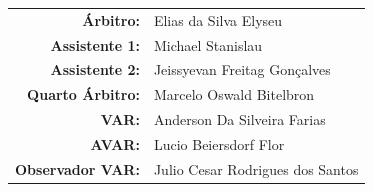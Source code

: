 \documentclass[11pt]{article}
\newcommand{\teamjersey}{}
\begin{document}
\vspace{0.5cm}
\begin{minipage}{0.65\textwidth}
\begin{center}
\begin{tabular}{rl}
\textbf{Árbitro:} & Elias da Silva Elyseu \\
\textbf{Assistente 1:} & Michael Stanislau \\
\textbf{Assistente 2:} & Jeissyevan Freitag Gonçalves \\
\textbf{Quarto Árbitro:} & Marcelo Oswald Bitelbron \\
\textbf{VAR:} & Anderson Da Silveira Farias \\
\textbf{AVAR:} & Lucio Beiersdorf Flor \\
\textbf{Observador VAR:} & Julio Cesar Rodrigues dos Santos \\
\end{tabular}
\end{center}
\end{minipage}
\begin{minipage}{0.3\textwidth}
\end{minipage}
\newpage
\vspace{0.5cm}
\renewcommand{\teamjersey}{../assets/camisa/costas1.png}
\end{document}
